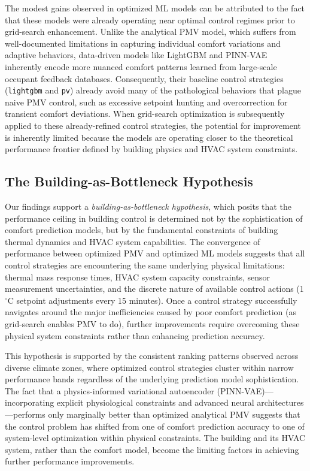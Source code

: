 The modest gains observed in optimized ML models can be attributed to the fact that these models were already operating near optimal control regimes prior to grid-search enhancement. Unlike the analytical PMV model, which suffers from well-documented limitations in capturing individual comfort variations and adaptive behaviors, data-driven models like LightGBM and PINN-VAE inherently encode more nuanced comfort patterns learned from large-scale occupant feedback databases. Consequently, their baseline control strategies (\texttt{lightgbm} and \texttt{pv}) already avoid many of the pathological behaviors that plague naive PMV control, such as excessive setpoint hunting and overcorrection for transient comfort deviations. When grid-search optimization is subsequently applied to these already-refined control strategies, the potential for improvement is inherently limited because the models are operating closer to the theoretical performance frontier defined by building physics and HVAC system constraints.

\subsection{The Building-as-Bottleneck Hypothesis}

Our findings support a \textit{building-as-bottleneck hypothesis}, which posits that the performance ceiling in building control is determined not by the sophistication of comfort prediction models, but by the fundamental constraints of building thermal dynamics and HVAC system capabilities. The convergence of performance between optimized PMV and optimized ML models suggests that all control strategies are encountering the same underlying physical limitations: thermal mass response times, HVAC system capacity constraints, sensor measurement uncertainties, and the discrete nature of available control actions (1$^\circ$C setpoint adjustments every 15 minutes). Once a control strategy successfully navigates around the major inefficiencies caused by poor comfort prediction (as grid-search enables PMV to do), further improvements require overcoming these physical system constraints rather than enhancing prediction accuracy.

This hypothesis is supported by the consistent ranking patterns observed across diverse climate zones, where optimized control strategies cluster within narrow performance bands regardless of the underlying prediction model sophistication. The fact that a physics-informed variational autoencoder (PINN-VAE)—incorporating explicit physiological constraints and advanced neural architectures—performs only marginally better than optimized analytical PMV suggests that the control problem has shifted from one of comfort prediction accuracy to one of system-level optimization within physical constraints. The building and its HVAC system, rather than the comfort model, become the limiting factors in achieving further performance improvements.



